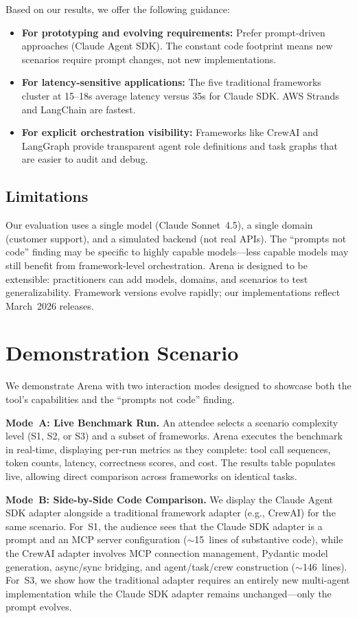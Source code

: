 \documentclass[sigconf]{acmart}
\begin{document}
Based on our results, we offer the following guidance:
\begin{itemize}[leftmargin=*,nosep]
  \item \textbf{For prototyping and evolving requirements:} Prefer prompt-driven approaches (Claude Agent SDK). The constant code footprint means new scenarios require prompt changes, not new implementations.
  \item \textbf{For latency-sensitive applications:} The five traditional frameworks cluster at 15--18s average latency versus 35s for Claude SDK. AWS Strands and LangChain are fastest.
  \item \textbf{For explicit orchestration visibility:} Frameworks like CrewAI and LangGraph provide transparent agent role definitions and task graphs that are easier to audit and debug.
\end{itemize}

\subsection{Limitations}

Our evaluation uses a single model (Claude Sonnet~4.5), a single domain (customer support), and a simulated backend (not real APIs). The ``prompts not code'' finding may be specific to highly capable models---less capable models may still benefit from framework-level orchestration. Arena is designed to be extensible: practitioners can add models, domains, and scenarios to test generalizability. Framework versions evolve rapidly; our implementations reflect March~2026 releases.

\section{Demonstration Scenario}

We demonstrate Arena with two interaction modes designed to showcase both the tool's capabilities and the ``prompts not code'' finding.

\textbf{Mode~A: Live Benchmark Run.}
An attendee selects a scenario complexity level (S1, S2, or S3) and a subset of frameworks. Arena executes the benchmark in real-time, displaying per-run metrics as they complete: tool call sequences, token counts, latency, correctness scores, and cost. The results table populates live, allowing direct comparison across frameworks on identical tasks.

\textbf{Mode~B: Side-by-Side Code Comparison.}
We display the Claude Agent SDK adapter alongside a traditional framework adapter (e.g., CrewAI) for the same scenario. For~S1, the audience sees that the Claude SDK adapter is a prompt and an MCP server configuration ($\sim$15~lines of substantive code), while the CrewAI adapter involves MCP connection management, Pydantic model generation, async/sync bridging, and agent/task/crew construction ($\sim$146~lines). For~S3, we show how the traditional adapter requires an entirely new multi-agent implementation while the Claude SDK adapter remains unchanged---only the prompt evolves.
\end{document}
